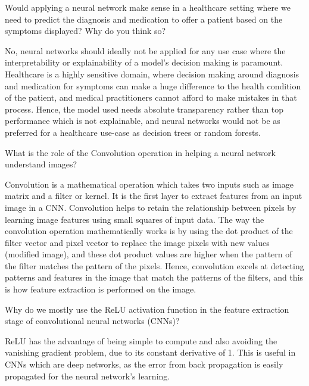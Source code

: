 	\begin{qanda}
		\begin{question}
Would applying a neural network make sense in a healthcare setting where we need to predict the diagnosis and medication to offer a patient based on the symptoms displayed? Why do you think so?
		\end{question}
		\begin{answer}
No, neural networks should ideally not be applied for any use case where the interpretability or explainability of a model's decision making is paramount. Healthcare is a highly sensitive domain, where decision making around diagnosis and medication for symptoms can make a huge difference to the health condition of the patient, and medical practitioners cannot afford to make mistakes in that process. Hence, the model used needs absolute transparency rather than top performance which is not explainable, and neural networks would not be as preferred for a healthcare use-case as decision trees or random forests.
		\end{answer}
	\end{qanda}

	\begin{qanda}
		\begin{question}
What is the role of the Convolution operation in helping a neural network understand images?
		\end{question}
		\begin{answer}
Convolution is a mathematical operation which takes two inputs such as image matrix and a filter or kernel. It is the first layer to extract features from an input image in a CNN. Convolution helps to retain the relationship between pixels by learning image features using small squares of input data. The way the convolution operation mathematically works is by using the dot product of the filter vector and pixel vector to replace the image pixels with new values (modified image), and these dot product values are higher when the pattern of the filter matches the pattern of the pixels. Hence, convolution excels at detecting patterns and features in the image that match the patterns of the filters, and this is how feature extraction is performed on the image.
		\end{answer}
	\end{qanda}

	\begin{qanda}
		\begin{question}
Why do we mostly use the ReLU activation function in the feature extraction stage of convolutional neural networks (CNNs)?
		\end{question}
		\begin{answer}
ReLU has the advantage of being simple to compute and also avoiding the vanishing gradient problem, due to its constant derivative of 1. This is useful in CNNs which are deep networks, as the error from back propagation is easily propagated for the neural network's learning.
		\end{answer}
	\end{qanda}

